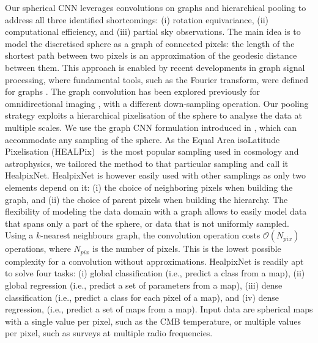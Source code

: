 \documentclass[final,twocolumn,3p,times,sort&compress]{elsarticle}
\newcommand{\nati}[1]{{\color[rgb]{.1,.6,.1}{#1}}}
\newcommand{\1}{\b{1}}              %
\newcommand{\0}{\b{0}}              %
\begin{document}
Our spherical CNN leverages convolutions on graphs and hierarchical pooling to address all three identified shortcomings: (i) rotation equivariance, (ii) computational efficiency, and (iii) partial sky observations.
The main idea is to model the discretised sphere as a graph of connected pixels: the length of the shortest path between two pixels is an approximation of the geodesic distance between them.
This approach is enabled by recent developments in graph signal processing, where fundamental tools, such as the Fourier transform, were defined for graphs \citep{shuman2013emerging}.
The graph convolution has been explored previously for omnidirectional imaging \citep{khasanova2017graphomni}, with a different down-sampling operation.
Our pooling strategy exploits a hierarchical pixelisation of the sphere to analyse the data at multiple scales.
We use the graph CNN formulation introduced in \citep{defferrard2016convolutional}, which can accommodate any sampling of the sphere.
As the Equal Area isoLatitude Pixelisation (HEALPix)~\citep{gorski2005healpix} is the most popular sampling used in cosmology and astrophysics, we tailored the method to that particular sampling and call it HealpixNet.
HealpixNet is however easily used with other samplings as only two elements depend on it: (i) the choice of neighboring pixels when building the graph, and (ii) the choice of parent pixels when building the hierarchy.
The flexibility of modeling the data domain with a graph allows to easily model data that spans only a part of the sphere, or data that is not uniformly sampled.
Using a $k$-nearest neighbours graph, the convolution operation costs $\mathcal{O}(N_{pix})$ operations, where $N_{pix}$ is the number of pixels.
This is the lowest possible complexity for a convolution without approximations.
HealpixNet is readily apt to solve four tasks: (i) global classification (i.e., predict a class from a map), (ii) global regression (i.e., predict a set of parameters from a map), (iii) dense classification (i.e., predict a class for each pixel of a map), and (iv) dense regression, (i.e., predict a set of maps from a map).
Input data are spherical maps with a single value per pixel, such as the CMB temperature, or multiple values per pixel, such as surveys at multiple radio frequencies.

\end{document}
